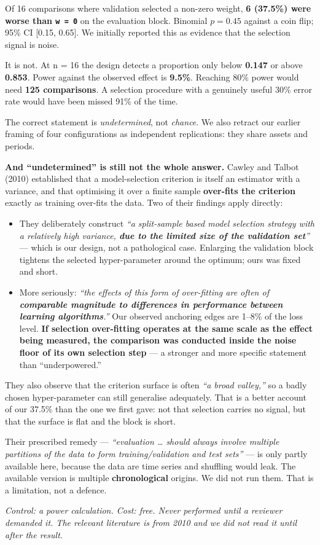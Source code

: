 Of 16 comparisons where validation selected a non-zero weight, \textbf{6 (37.5\%) were worse than
\texttt{w\ =\ 0}} on the evaluation block. Binomial \(p = 0.45\) against a coin flip; 95\% CI
{[}0.15, 0.65{]}. We initially reported this as evidence that the selection signal is noise.

It is not. At n = 16 the design detects a proportion only below \textbf{0.147} or above \textbf{0.853}.
Power against the observed effect is \textbf{9.5\%}. Reaching 80\% power would need \textbf{125
comparisons}. A selection procedure with a genuinely useful 30\% error rate would have been
missed 91\% of the time.

The correct statement is \emph{undetermined}, not \emph{chance}. We also retract our earlier framing of
four configurations as independent replications: they share assets and periods.

\textbf{And ``undetermined'' is still not the whole answer.} Cawley and Talbot (2010) established that
a model-selection criterion is itself an estimator with a variance, and that optimising it over
a finite sample \textbf{over-fits the criterion} exactly as training over-fits the data. Two of their
findings apply directly:

\begin{itemize}
\tightlist
\item
  They deliberately construct \emph{``a split-sample based model selection strategy with a relatively
  high variance, \textbf{due to the limited size of the validation set}''} --- which is our design, not
  a pathological case. Enlarging the validation block tightens the selected hyper-parameter
  around the optimum; ours was fixed and short.
\item
  More seriously: \emph{``the effects of this form of over-fitting are often of \textbf{comparable magnitude
  to differences in performance between learning algorithms}.''} Our observed anchoring edges
  are 1--8\% of the loss level. \textbf{If selection over-fitting operates at the same scale as the
  effect being measured, the comparison was conducted inside the noise floor of its own
  selection step} --- a stronger and more specific statement than ``underpowered.''
\end{itemize}

They also observe that the criterion surface is often \emph{``a broad valley,''} so a badly chosen
hyper-parameter can still generalise adequately. That is a better account of our 37.5\% than the
one we first gave: not that selection carries no signal, but that the surface is flat and the
block is short.

Their prescribed remedy --- \emph{``evaluation \ldots{} should always involve multiple partitions of the data
to form training/validation and test sets''} --- is only partly available here, because the data
are time series and shuffling would leak. The available version is multiple \textbf{chronological}
origins. We did not run them. That is a limitation, not a defence.

\emph{Control: a power calculation. Cost: free. Never performed until a reviewer demanded it.
The relevant literature is from 2010 and we did not read it until after the result.}

